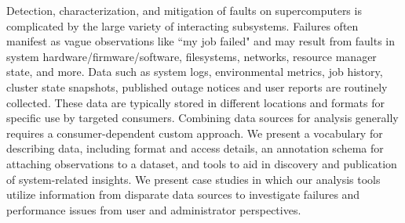 Detection, characterization, and mitigation of faults on supercomputers is
complicated by the large variety of interacting subsystems. Failures often
manifest as vague observations like ``my job failed" and may result from
faults in system
hardware/firmware/software, filesystems, networks, resource manager state, and
more.  Data such as system logs, environmental metrics, job history, cluster
state snapshots, published outage notices and user reports are routinely
collected. These data are typically stored in different locations and formats
for specific use by targeted consumers. Combining data sources for analysis
generally requires a consumer-dependent custom approach.  We present a
vocabulary for describing data, including format and access details, an
annotation schema for attaching observations to a dataset, and tools to aid in
discovery and publication of system-related insights. We present case studies in
which our analysis tools utilize information from disparate data sources to
investigate failures and performance issues from user and administrator perspectives.

